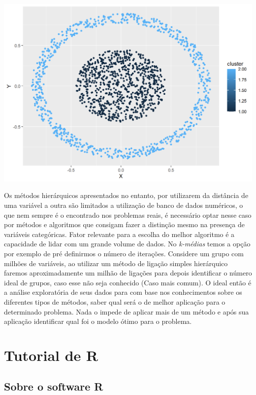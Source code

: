 \documentclass[
  letterpaper,
  DIV=11,
  numbers=noendperiod]{scrreprt}
\begin{document}
\includegraphics{./figuras_naosupervisionado/unnamed-chunk-20-1.png}

Os métodos hierárquicos apresentados no entanto, por utilizarem da
distância de uma variável a outra são limitados a utilização de banco de
dados numéricos, o que nem sempre é o encontrado nos problemas reais, é
necessário optar nesse caso por métodos e algoritmos que consigam fazer
a distinção mesmo na presença de variáveis categóricas. Fator relevante
para a escolha do melhor algoritmo é a capacidade de lidar com um grande
volume de dados. No \emph{k-médias} temos a opção por exemplo de pré
definirmos o número de iterações. Considere um grupo com milhões de
variáveis, ao utilizar um método de ligação simples hierárquico faremos
aproximadamente um milhão de ligações para depois identificar o número
ideal de grupos, caso esse não seja conhecido (Caso mais comum). O ideal
então é a análise exploratória de seus dados para com base nos
conhecimentos sobre os diferentes tipos de métodos, saber qual será o de
melhor aplicação para o determinado problema. Nada o impede de aplicar
mais de um método e após sua aplicação identificar qual foi o modelo
ótimo para o problema.

\appendix
{}

\hypertarget{tutorial-de-r}{%
\chapter{Tutorial de R}\label{tutorial-de-r}}

\hypertarget{sobre-o-software-r}{%
\section{Sobre o software R}\label{sobre-o-software-r}}
\end{document}
